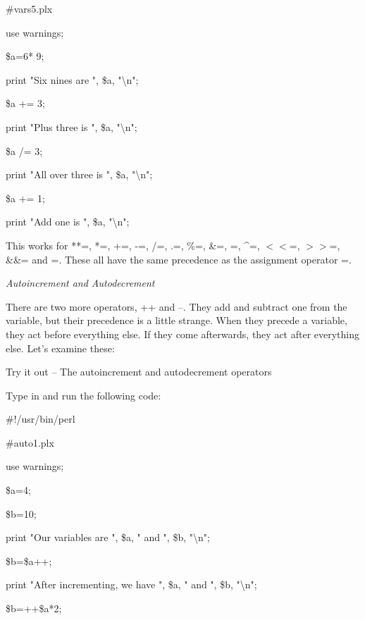 \documentclass[a4paper,11pt]{book}
\begin{document}
\noindent \#vars5.plx

\noindent use warnings;

\noindent \$a=6* 9;

\noindent print "Six nines are ", \$a, "\textbackslash n";

\noindent \$a += 3;

\noindent print "Plus three is ", \$a, "\textbackslash n";

\noindent \$a /= 3;

\noindent print "All over three is ", \$a, "\textbackslash n";

\noindent \$a += 1;

\noindent print "Add one is ", \$a, "\textbackslash n";

\noindent 

\noindent This works for **=, *=, +=, -=, /=, .=, \%=, \&=, \textbar =, \^{}=, $<$$<$=, $>$$>$=, \&\&= and \textbar \textbar =. These all have the same precedence as the assignment operator =.

\noindent 

\noindent 

\noindent \textit{Autoincrement and Autodecrement}

\noindent There are two more operators, ++ and --. They add and subtract one from the variable, but their precedence is a little strange. When they precede a variable, they act before everything else. If they come afterwards, they act after everything else. Let's examine these:

\noindent 

\noindent Try it out -- The autoincrement and autodecrement operators

\noindent Type in and run the following code:

\noindent 

\noindent 

\noindent \#!/usr/bin/perl

\noindent \#auto1.plx

\noindent use warnings;

\noindent \$a=4;

\noindent \$b=10;

\noindent print "Our variables are ", \$a, " and ", \$b, "\textbackslash n";

\noindent \$b=\$a++;

\noindent print "After incrementing, we have ", \$a, " and ", \$b, "\textbackslash n";

\noindent \$b=++\$a*2;
\end{document}
